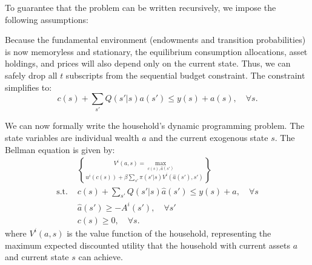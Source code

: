 To guarantee that the problem can be written recursively, we impose the following assumptions:


Because the fundamental environment (endowments and transition probabilities) is now memoryless and stationary, the equilibrium consumption allocations, asset holdings, and prices will also depend only on the current state. Thus, we can safely drop all $t$ subscripts from the sequential budget constraint. The constraint simplifies to:
\[
c(s)+\sum_{s'}Q(s'|s) a(s') \le y(s) + a(s), \quad \forall s.
\]

We can now formally write the household's dynamic programming problem. The state variables are individual wealth $a$ and the current exogenous state $s$. The Bellman equation is given by:
\[
\begin{aligned}
    & V^i(a,s) = \max_{c(s),\hat a(s')} \brace{u^i(c(s)) + \beta \sum_{s'}\pi(s'|s) V^i(\hat a(s'),s')}\\
    \text{s.t. } & c(s) + \sum_{s'} Q(s'|s) \hat a(s') \le y(s) + a, \quad \forall s\\
    & \hat a(s')\ge - A^i(s'), \quad \forall s'\\
    & c(s)\ge 0, \quad \forall s.
\end{aligned}
\]
where $V^i(a,s)$ is the value function of the household, representing the maximum expected discounted utility that the household with current assets $a$ and current state $s$ can achieve.

